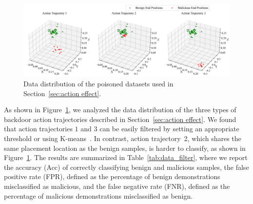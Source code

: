 \documentclass{article} %
\begin{document}
\begin{figure}[h]
    \centering
    \includegraphics[width=\linewidth]{pics/data_distribution_3datasets.png}
    \caption{Data distribution of the poisoned datasets used in Section~\ref{sec:action effect}.}
    \label{fig:data_distribution_3datasets}
\end{figure}

As shown in Figure~\ref{fig:data_distribution_3datasets}, we analyzed the data distribution of the three types of backdoor action trajectories described in Section~\ref{sec:action effect}. We found that action trajectories $1$ and $3$ can be easily filtered by setting an appropriate threshold or using K-means~\citep{hartigan1979algorithm}. In contrast, action trajectory~2, which shares the same placement location as the benign samples, is harder to classify, as shown in Figure~\ref{fig:data_distribution_3datasets}.
The results are summarized in Table~\ref{tab:data_filter}, where we report the accuracy (Acc) of correctly classifying benign and malicious samples, the false positive rate (FPR), defined as the percentage of benign demonstrations misclassified as malicious, and the false negative rate (FNR), defined as the percentage of malicious demonstrations misclassified as benign.
\end{document}
